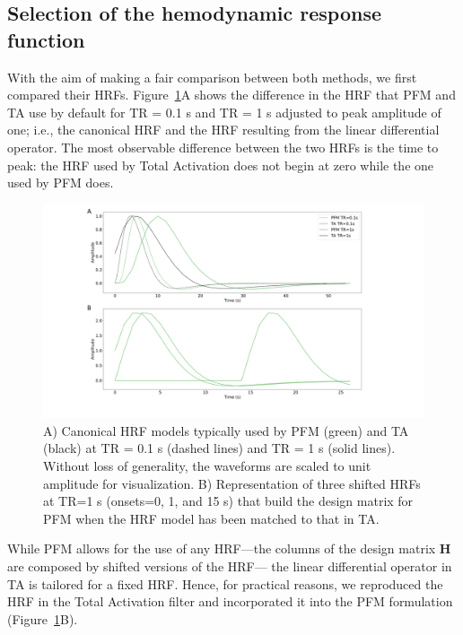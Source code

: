 \subsection{Selection of the hemodynamic response function}

With the aim of making a fair comparison between both methods, we first compared their HRFs. Figure~\ref{fig:hrf_diff}A shows the difference in the HRF that PFM and TA use by default for TR = 0.1 s and TR = 1 s adjusted to peak amplitude of one; i.e., the canonical HRF and the HRF resulting from the linear differential operator. The most observable difference between the two HRFs is the time to peak: the HRF used by Total Activation does not begin at zero while the one used by PFM does.

\begin{figure}[h]
    \includegraphics[width=\columnwidth]{figures/pfm_ta_hrf.pdf}
    \caption{A) Canonical HRF models typically used by PFM (green) and TA (black) at TR = 0.1 s (dashed lines) and TR = 1 s (solid lines). Without loss of generality, the waveforms are scaled to unit amplitude for visualization. B) Representation of three shifted HRFs at TR=1 s (onsets=0, 1, and 15 s) that build the design matrix for PFM when the HRF model has been matched to that in TA.}
\label{fig:hrf_diff}
\end{figure}

While PFM allows for the use of any HRF---the columns of the design matrix \(\mathbf{H}\) are composed by shifted versions of the HRF--- the linear differential operator in TA is tailored for a fixed HRF. Hence, for practical reasons, we reproduced the HRF in the Total Activation filter and incorporated it into the PFM formulation (Figure~\ref{fig:hrf_diff}B).

